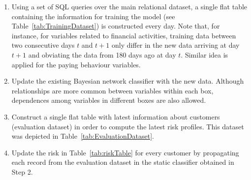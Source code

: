 \begin{enumerate}
\item Using a set of SQL queries over the main relational dataset, a single flat table containing the information for training the model (see Table~\ref{tab:TrainingDataset}) is constructed every day. Note that, for instance, for variables related to financial activities, training data between two consecutive days $t$ and $t+1$ only differ in the new data arriving at day $t+1$ and obviating the data from 180 days ago at day $t$. Similar idea is applied for the paying behaviour variables.
\item Update the existing Bayesian network classifier with the new data.  Although relationships are more common between variables within each box, dependences among variables in different boxes are also allowed. 
\item Construct a single flat table with latest information about customers (evaluation dataset) in order to compute the latest risk profiles. This dataset was depicted in Table~\ref{tab:EvaluationDataset}.
\item Update the risk in Table~\ref{tab:riskTable} for every customer by propagating each record from the evaluation dataset in the static classifier obtained in Step 2. 
\end{enumerate}





